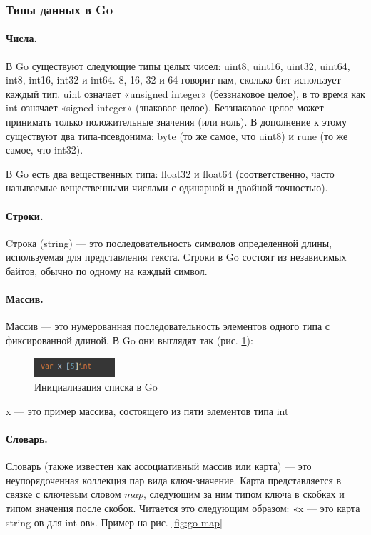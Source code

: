 \subsubsection{Типы данных в Go}

\paragraph{Числа.}
В Go существуют следующие типы целых чисел: uint8, uint16, uint32, uint64, int8, int16, int32 и int64. 8, 16, 32 и 64 говорит нам, сколько бит использует каждый тип. uint означает «unsigned integer» (беззнаковое целое), в то время как int означает «signed integer» (знаковое целое). Беззнаковое целое может принимать только положительные значения (или ноль). В дополнение к этому существуют два типа-псевдонима: byte (то же самое, что uint8) и rune (то же самое, что int32).
\par 
В Go есть два вещественных типа: float32 и float64 (соответственно, часто называемые вещественными числами с одинарной и двойной точностью).
\paragraph{Строки.} 
Cтрока (string) — это последовательность символов определенной длины, используемая для представления текста. Строки в Go состоят из независимых байтов, обычно по одному на каждый символ.
\paragraph{Массив.} 
Массив — это нумерованная последовательность элементов одного типа с фиксированной длиной. В Go они выглядят так (рис. \ref{fig:go-slice}):

\begin{figure}[!ht]
\centering
\includegraphics[width=3cm]{Kenenbek/images/go-slice.png}
\caption{Инициализация списка в Go}
\label{fig:go-slice}
\end{figure}

x — это пример массива, состоящего из пяти элементов типа int
\paragraph{Словарь.} 
Словарь (также известен как ассоциативный массив или карта) — это неупорядоченная коллекция пар вида ключ-значение. Карта представляется в связке с ключевым словом $map$, следующим за ним типом ключа в скобках и типом значения после скобок. Читается это следующим образом: «x — это карта string-ов для int-ов». Пример на рис. \ref{fig:go-map}

